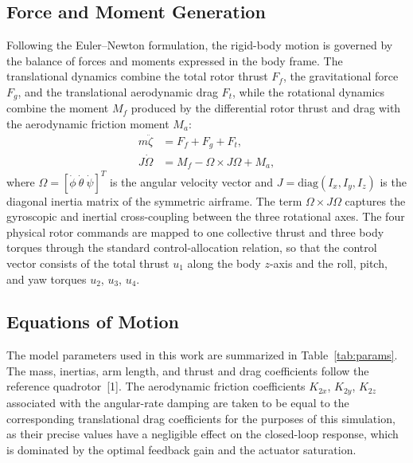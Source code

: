 \documentclass[conference]{IEEEtran}
\begin{document}
\subsection{Force and Moment Generation}
Following the Euler--Newton formulation, the rigid-body motion is governed by the balance of forces and moments expressed in the body frame. The translational dynamics combine the total rotor thrust $F_f$, the gravitational force $F_g$, and the translational aerodynamic drag $F_t$, while the rotational dynamics combine the moment $M_f$ produced by the differential rotor thrust and drag with the aerodynamic friction moment $M_a$:
\begin{align}
m\ddot{\zeta} &= F_f + F_g + F_t,\\
J\dot{\Omega} &= M_f - \Omega \times J\Omega + M_a,
\end{align}
where $\Omega = [\dot\phi\ \dot\theta\ \dot\psi]^{T}$ is the angular velocity vector and $J = \mathrm{diag}(I_x, I_y, I_z)$ is the diagonal inertia matrix of the symmetric airframe. The term $\Omega \times J\Omega$ captures the gyroscopic and inertial cross-coupling between the three rotational axes. The four physical rotor commands are mapped to one collective thrust and three body torques through the standard control-allocation relation, so that the control vector consists of the total thrust $u_1$ along the body $z$-axis and the roll, pitch, and yaw torques $u_2$, $u_3$, $u_4$.

\subsection{Equations of Motion}
The model parameters used in this work are summarized in Table~\ref{tab:params}. The mass, inertias, arm length, and thrust and drag coefficients follow the reference quadrotor~[1]. The aerodynamic friction coefficients $K_{2x}$, $K_{2y}$, $K_{2z}$ associated with the angular-rate damping are taken to be equal to the corresponding translational drag coefficients for the purposes of this simulation, as their precise values have a negligible effect on the closed-loop response, which is dominated by the optimal feedback gain and the actuator saturation.
\end{document}
